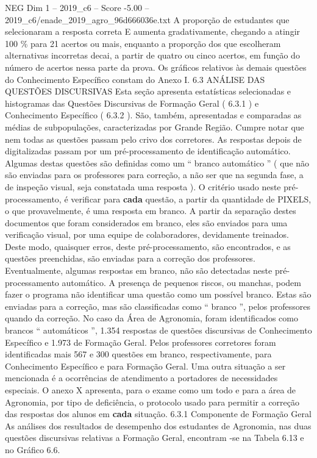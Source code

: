 \begin{textsample}{NEG Dim 1 – 2019\_c6 – Score -5.00 – 2019\_c6/enade\_2019\_agro\_96d666036e.txt}
A proporção de estudantes que selecionaram a resposta correta E aumenta gradativamente, chegando a atingir 100 \% para 21 acertos ou mais, enquanto a proporção dos que escolheram alternativas incorretas decai, a partir de quatro ou cinco acertos, em função do número de acertos nessa parte da prova.
Os gráficos relativos às demais questões do Conhecimento Específico constam do Anexo I. 6.3 ANÁLISE DAS QUESTÕES DISCURSIVAS Esta seção apresenta estatísticas selecionadas e histogramas das Questões Discursivas de Formação Geral ( 6.3.1 ) e Conhecimento Específico ( 6.3.2 ).
São, também, apresentadas e comparadas as médias de subpopulações, caracterizadas por Grande Região.
Cumpre notar que nem todas as questões passam pelo crivo dos corretores.
As respostas depois de digitalizadas passam por um pré-processamento de identificação automático.
Algumas destas questões são definidas como um “ branco automático ” ( que não são enviadas para os professores para correção, a não ser que na segunda fase, a de inspeção visual, seja constatada uma resposta ).
O critério usado neste pré-processamento, é verificar para \textbf{cada} questão, a partir da quantidade de PIXELS, o que provavelmente, é uma resposta em branco.
A partir da separação destes documentos que foram considerados em branco, eles são enviados para uma verificação visual, por uma equipe de colaboradores, devidamente treinados.
Deste modo, quaisquer erros, deste pré-processamento, são encontrados, e as questões preenchidas, são enviadas para a correção dos professores.
Eventualmente, algumas respostas em branco, não são detectadas neste pré-processamento automático.
A presença de pequenos riscos, ou manchas, podem fazer o programa não identificar uma questão como um possível branco.
Estas são enviadas para a correção, mas são classificadas como “ branco ”, pelos professores quando da correção.
No caso da Área de Agronomia, foram identificados como brancos “ automáticos ”, 1.354 respostas de questões discursivas de Conhecimento Específico e 1.973 de Formação Geral.
Pelos professores corretores foram identificadas mais 567 e 300 questões em branco, respectivamente, para Conhecimento Específico e para Formação Geral.
Uma outra situação a ser mencionada é a ocorrências de atendimento a portadores de necessidades especiais.
O anexo X apresenta, para o exame como um todo e para a área de Agronomia, por tipo de deficiência, o protocolo usado para permitir a correção das respostas dos alunos em \textbf{cada} situação. 6.3.1 Componente de Formação Geral As análises dos resultados de desempenho dos estudantes de Agronomia, nas duas questões discursivas relativas a Formação Geral, encontram -se na Tabela 6.13 e no Gráfico 6.6.

\end{textsample}
